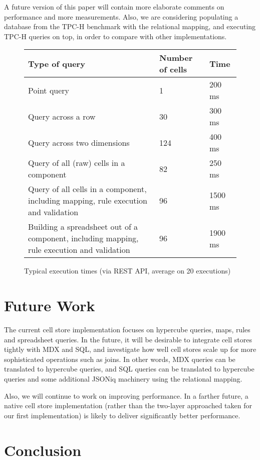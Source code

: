 \documentclass{acm_proc_article-sp}
\begin{document}
A future version of this paper will contain more elaborate comments on performance and more measurements. Also, we are considering populating a database from the TPC-H benchmark with the relational mapping, and executing TPC-H queries on top, in order to compare with other implementations.

\begin{figure*}
\caption{Typical execution times (via REST API, average on 20 executions)}
\label{fig-measurements}
\begin{tabular}{|l|l|l|}
\hline
Type of query & Number of cells & Time \\
\hline
\hline
Point query & 1 & 200 ms \\
\hline
Query across a row&30& 300 ms \\
\hline
Query across two dimensions&124& 400 ms \\
\hline
Query of all (raw) cells in a component &82& 250 ms \\
\hline
Query of all cells in a component, including mapping, rule execution and validation& 96& 1500 ms \\
\hline
Building a spreadsheet out of a component, including mapping, rule execution and validation & 96 & 1900 ms \\
\hline
\end{tabular}
\end{figure*}

\section{Future Work}

The current cell store implementation focuses on hypercube queries, maps, rules and spreadsheet queries. In the future, it will be desirable to integrate cell stores tightly with MDX and SQL, and investigate how well cell stores scale up for more sophisticated operations such as joins. In other words, MDX queries can be translated to hypercube queries, and SQL queries can be translated to hypercube queries and some additional JSONiq machinery using the relational mapping.

Also, we will continue to work on improving performance. In a farther future, a native cell store implementation (rather than the two-layer approached taken for our first implementation) is likely to deliver significantly better performance.

\section{Conclusion}
\end{document}
